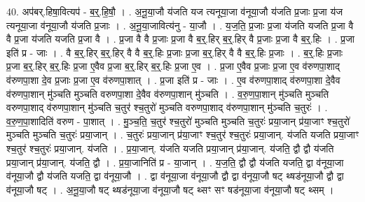 \documentclass[17pt]{extarticle}
\begin{document}
40. अप॑बर्.हिषा॒वित्यप॑ - ब॒र्॒.हि॒षौ॒ । . अ॒नू॒या॒जौ य॑जति यज त्यनूया॒जा व॑नूया॒जौ य॑जति प्र॒जाः प्र॒जा य॑ज त्यनूया॒जा व॑नूया॒जौ य॑जति प्र॒जाः । . अ॒नू॒या॒जावित्य॑नु - या॒जौ । . य॒ज॒ति॒ प्र॒जाः प्र॒जा य॑जति यजति प्र॒जा वै वै प्र॒जा य॑जति यजति प्र॒जा वै । . प्र॒जा वै वै प्र॒जाः प्र॒जा वै ब॒र्॒.हिर् ब॒र्॒.हिर् वै प्र॒जाः प्र॒जा वै ब॒र्॒.हिः । . प्र॒जा इति॑ प्र - जाः । . वै ब॒र्॒.हिर् ब॒र्॒.हिर् वै वै ब॒र्॒.हिः प्र॒जाः प्र॒जा ब॒र्॒.हिर् वै वै ब॒र्॒.हिः प्र॒जाः । . ब॒र्॒.हिः प्र॒जाः प्र॒जा ब॒र्॒.हिर् ब॒र्॒.हिः प्र॒जा ए॒वैव प्र॒जा ब॒र्॒.हिर् ब॒र्॒.हिः प्र॒जा ए॒व । . प्र॒जा ए॒वैव प्र॒जाः प्र॒जा ए॒व व॑रुणपा॒शाद् व॑रुणपा॒शा दे॒व प्र॒जाः प्र॒जा ए॒व व॑रुणपा॒शात् । . प्र॒जा इति॑ प्र - जाः । . ए॒व व॑रुणपा॒शाद् व॑रुणपा॒शा दे॒वैव व॑रुणपा॒शान् मु॑ञ्चति मुञ्चति वरुणपा॒शा दे॒वैव व॑रुणपा॒शान् मु॑ञ्चति । . व॒रु॒ण॒पा॒शान् मु॑ञ्चति मुञ्चति वरुणपा॒शाद् व॑रुणपा॒शान् मु॑ञ्चति च॒तुर॑ श्च॒तुरो॑ मुञ्चति वरुणपा॒शाद् व॑रुणपा॒शान् मु॑ञ्चति च॒तुरः॑ । . व॒रु॒ण॒पा॒शादिति॑ वरुण - पा॒शात् । . मु॒ञ्च॒ति॒ च॒तुर॑ श्च॒तुरो॑ मुञ्चति मुञ्चति च॒तुरः॑ प्रया॒जान् प्र॑या॒जाꣳ श्च॒तुरो॑ मुञ्चति मुञ्चति च॒तुरः॑ प्रया॒जान् । . च॒तुरः॑ प्रया॒जान् प्र॑या॒जाꣳ श्च॒तुर॑ श्च॒तुरः॑ प्रया॒जान्. य॑जति यजति प्रया॒जाꣳ
श्च॒तुर॑ श्च॒तुरः॑ प्रया॒जान्. य॑जति । . प्र॒या॒जान्. य॑जति यजति प्रया॒जान् प्र॑या॒जान्. य॑जति॒ द्वौ द्वौ य॑जति प्रया॒जान् प्र॑या॒जान्. य॑जति॒ द्वौ । . प्र॒या॒जानिति॑ प्र - या॒जान् । . य॒ज॒ति॒ द्वौ द्वौ य॑जति यजति॒ द्वा व॑नूया॒जा व॑नूया॒जौ द्वौ य॑जति यजति॒ द्वा व॑नूया॒जौ । . द्वा व॑नूया॒जा व॑नूया॒जौ द्वौ द्वा व॑नूया॒जौ षट् थ्षड॑नूया॒जौ द्वौ द्वा व॑नूया॒जौ षट् । . अ॒नू॒या॒जौ षट् थ्षड॑नूया॒जा व॑नूया॒जौ षट् थ्सꣳ सꣳ षड॑नूया॒जा व॑नूया॒जौ षट् थ्सम् । \newline
\end{document}
